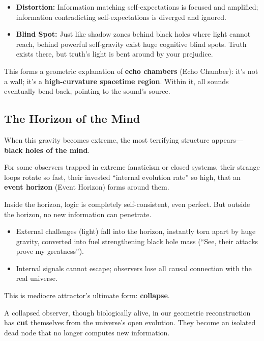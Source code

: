 \documentclass[11pt,a4paper,twoside]{book}
\begin{document}
\begin{itemize}
\item \textbf{Distortion:} Information matching self-expectations is focused and amplified; information contradicting self-expectations is diverged and ignored.

\item \textbf{Blind Spot:} Just like shadow zones behind black holes where light cannot reach, behind powerful self-gravity exist huge cognitive blind spots. Truth exists there, but truth's light is bent around by your prejudice.
\end{itemize}

This forms a geometric explanation of \textbf{echo chambers} (Echo Chamber): it's not a wall; it's a \textbf{high-curvature spacetime region}. Within it, all sounds eventually bend back, pointing to the sound's source.

\subsection{The Horizon of the Mind}

When this gravity becomes extreme, the most terrifying structure appears---\textbf{black holes of the mind}.

For some observers trapped in extreme fanaticism or closed systems, their strange loops rotate so fast, their invested ``internal evolution rate'' so high, that an \textbf{event horizon} (Event Horizon) forms around them.

Inside the horizon, logic is completely self-consistent, even perfect. But outside the horizon, no new information can penetrate.

\begin{itemize}
\item External challenges (light) fall into the horizon, instantly torn apart by huge gravity, converted into fuel strengthening black hole mass (``See, their attacks prove my greatness'').

\item Internal signals cannot escape; observers lose all causal connection with the real universe.
\end{itemize}

This is mediocre attractor's ultimate form: \textbf{collapse}.

A collapsed observer, though biologically alive, in our geometric reconstruction has \textbf{cut} themselves from the universe's open evolution. They become an isolated dead node that no longer computes new information.
\end{document}
